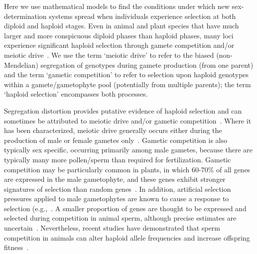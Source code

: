 \documentclass[10pt,letterpaper]{article}
\begin{document}
Here we use mathematical models to find the conditions under which new sex-determination systems spread when individuals experience selection at both diploid and haploid stages. 
Even in animal and plant species that have much larger and more conspicuous diploid phases than haploid phases, many loci experience significant haploid selection through gamete competition and/or meiotic drive~\cite{Mulcahy:1996ha,JOSEPH:2004haa}.
We use the term `meiotic drive' to refer to the biased (non-Mendelian) segregation of genotypes during gamete production (from one parent) and the term `gametic competition' to refer to selection upon haploid genotypes within a gamete/gametophyte pool (potentially from multiple parents); the term `haploid selection' encompasses both processes. 

Segregation distortion provides putative evidence of haploid selection and can sometimes be attributed to meiotic drive and/or gametic competition~\cite{Lalanne2004,Fishman2005,Leppala2008,Leppala2013,Didion2015,Didion2016}.
Where it has been characterized, meiotic drive generally occurs either during the production of male or female gametes only~\cite{Ubeda:2005gw,Lindholm:2016cw}.
Gametic competition is also typically sex specific, occurring primarily among male gametes, because there are typically many more pollen/sperm than required for fertilization.
Gametic competition may be particularly common in plants, in which 60-70\% of all genes are expressed in the male gametophyte, and these genes exhibit stronger signatures of selection than random genes~\cite{Borg:2009jpa,Arunkumar:2013iq,Gossmann:2014dua}.
In addition, artificial selection pressures applied to male gametophytes are known to cause a response to selection (e.g.,~\cite{Hormaza:1996cv,Ravikumar:2003uo,Hedhly:2004iv,Clarke:2004ir}. 
A smaller proportion of genes are thought to be expressed and selected during competition in animal sperm, although precise estimates are uncertain~\cite{Zheng:2001fi,JOSEPH:2004haa,Vibranovski:2010et}. 
Nevertheless, recent studies have demonstrated that sperm competition in animals can alter haploid allele frequencies and increase offspring fitness~\cite{Immler:2014im,Alavioon2017}.
\end{document}
